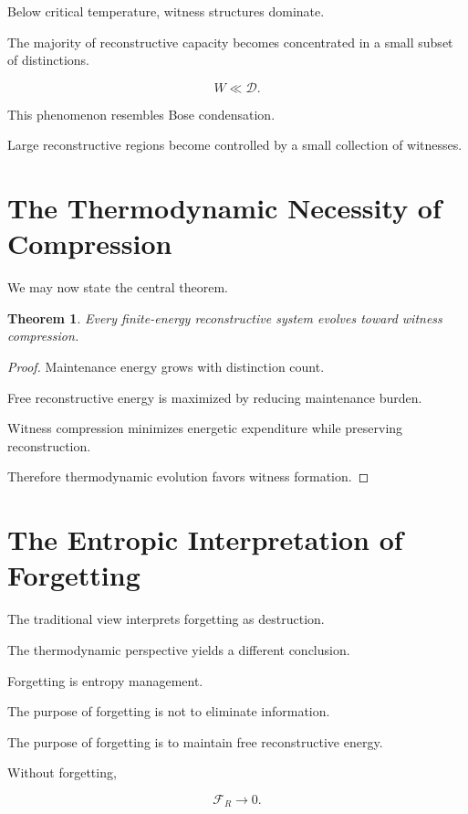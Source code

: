 \documentclass[12pt,oneside]{book}
\theoremstyle{plain} \newtheorem{theorem}{Theorem}[chapter] \newtheorem{lemma}[theorem]{Lemma} \newtheorem{proposition}[theorem]{Proposition} \newtheorem{corollary}[theorem]{Corollary}
\theoremstyle{definition} \newtheorem{definition}[theorem]{Definition} \newtheorem{axiom}[theorem]{Axiom} \newtheorem{construction}[theorem]{Construction}
\theoremstyle{remark} \newtheorem{remark}[theorem]{Remark} \newtheorem{example}[theorem]{Example}
\newcommand{\D}{\mathcal{D}} \newcommand{\R}{\mathcal{R}} \newcommand{\F}{\mathcal{F}} \newcommand{\U}{\mathcal{U}} \newcommand{\M}{\mathcal{M}} \newcommand{\G}{\Gamma}
\begin{document}
Below critical temperature, witness structures dominate.

The majority of reconstructive capacity becomes concentrated in a small subset of distinctions.

\[
W
\ll
\D.
\]

This phenomenon resembles Bose condensation.

Large reconstructive regions become controlled by a small collection of witnesses.

\section{The Thermodynamic Necessity of Compression}

We may now state the central theorem.

\begin{theorem}

Every finite-energy reconstructive system evolves toward witness compression.

\end{theorem}

\begin{proof}

Maintenance energy grows with distinction count.

Free reconstructive energy is maximized by reducing maintenance burden.

Witness compression minimizes energetic expenditure while preserving reconstruction.

Therefore thermodynamic evolution favors witness formation.

\end{proof}

\section{The Entropic Interpretation of Forgetting}

The traditional view interprets forgetting as destruction.

The thermodynamic perspective yields a different conclusion.

Forgetting is entropy management.

The purpose of forgetting is not to eliminate information.

The purpose of forgetting is to maintain free reconstructive energy.

Without forgetting,

\[
\mathcal F_R
\rightarrow
0.
\]
\end{document}
